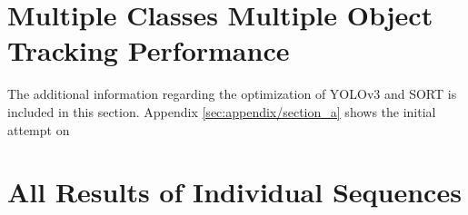 \chapter{Multiple Classes Multiple Object Tracking Performance}
The additional information regarding the optimization of YOLOv3 and SORT is included in this section. Appendix \ref{sec:appendix/section_a} shows the initial attempt on 



\chapter{All Results of Individual Sequences}


